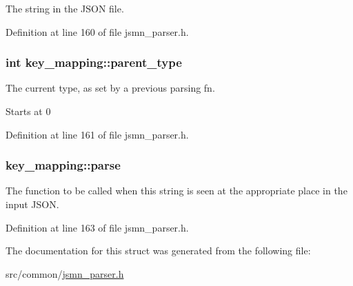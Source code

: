 The string in the J\-S\-O\-N file. 



Definition at line 160 of file jsmn\-\_\-parser.\-h.

\hypertarget{structkey__mapping_ae5ee4a8838ac3c188143edb081e78207}{
\subsubsection[{parent\-\_\-type}]{\setlength{\rightskip}{0pt plus 5cm}int key\-\_\-mapping\-::parent\-\_\-type}}\label{structkey__mapping_ae5ee4a8838ac3c188143edb081e78207}


The current type, as set by a previous parsing fn. 

Starts at 0 

Definition at line 161 of file jsmn\-\_\-parser.\-h.

\hypertarget{structkey__mapping_a5aaab47c145def7d5d253d8e3309b993}{
\subsubsection[{parse}]{ key\-\_\-mapping\-::parse}}\label{structkey__mapping_a5aaab47c145def7d5d253d8e3309b993}


The function to be called when this string is seen at the appropriate place in the input J\-S\-O\-N. 



Definition at line 163 of file jsmn\-\_\-parser.\-h.



The documentation for this struct was generated from the following file\-:\begin{DoxyCompactItemize}
\item 
src/common/\hyperlink{jsmn__parser_8h}{jsmn\-\_\-parser.\-h}\end{DoxyCompactItemize}
